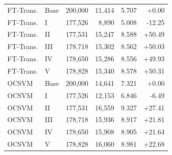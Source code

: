 \begin{longtable}{@{}llrrrr@{}}
FT-Trans. & Base & 200,000 & 11,414 & 5.707 & +0.00 \\
FT-Trans. & I & 177,526 & 8,890 & 5.008 & -12.25 \\
FT-Trans. & II & 177,531 & 15,247 & 8.588 & +50.49 \\
FT-Trans. & III & 178,718 & 15,302 & 8.562 & +50.03 \\
FT-Trans. & IV & 178,650 & 15,286 & 8.556 & +49.93 \\
FT-Trans. & V & 178,828 & 15,340 & 8.578 & +50.31 \\
OCSVM & Base & 200,000 & 14,641 & 7.321 & +0.00 \\
OCSVM & I & 177,526 & 12,153 & 6.846 & -6.49 \\
OCSVM & II & 177,531 & 16,559 & 9.327 & +27.41 \\
OCSVM & III & 178,718 & 15,936 & 8.917 & +21.81 \\
OCSVM & IV & 178,650 & 15,908 & 8.905 & +21.64 \\
OCSVM & V & 178,828 & 16,060 & 8.981 & +22.68 \\
\bottomrule
\end{longtable}

